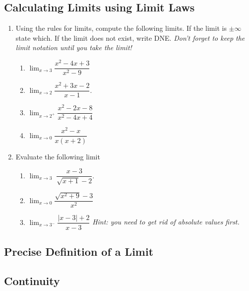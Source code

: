 \documentclass[letterpaper,11pt]{article}
\begin{document}
\subsection{Calculating Limits using Limit Laws}
\begin{enumerate}
  \item Using the rules for limits, compute the following limits. If the limit is $\pm \infty$ state which. If the limit does not exist, write DNE. \emph{Don't forget to keep the limit notation until you take the limit!}
  \begin{enumerate}
    \item $\displaystyle\lim_{x\to 3} \dfrac{x^2-4x+3}{x^2-9}$
    \item $\displaystyle\lim_{x\to 2} \dfrac{x^2+3x-2}{x-1}.$
    \item $\displaystyle\lim_{x\to 2^+} \dfrac{x^2-2x-8}{x^2-4x+4}$
    \item $\displaystyle\lim_{x\to 0} \dfrac{x^2-x}{x(x+2)}$
  \end{enumerate}
  \item Evaluate the following limit
  \begin{enumerate}
    \item $\displaystyle\lim_{x\to 3} \; \dfrac{x-3}{\sqrt{x+1}-2}.$
    \vfill
    \item $\displaystyle\lim_{x\to 0} \dfrac{\sqrt{x^2+9}-3}{x^2}$
    \vfill
    \item $\displaystyle\lim_{x\to 3^{-}} \dfrac{|x-3|+2}{x-3}$ \quad \emph{Hint: you need to get rid of absolute values first.}
    \vfill
  \end{enumerate}
\end{enumerate}

\newpage
\subsection{Precise Definition of a Limit}
\subsection{Continuity}
\end{document}
